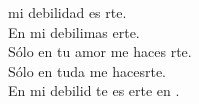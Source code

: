 \begin{cancion}%
	 mi debilidad es rte.\\
	En mi debilimas erte.\\
	Sólo en tu amor me haces rte.\\
	Sólo en tuda me hacesrte.\\
	En mi debilid te es erte en . \\
\end{cancion}%
